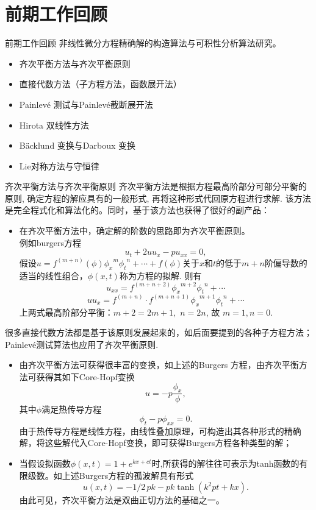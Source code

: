 \documentclass{beamer}
\begin{document}
\section{前期工作回顾}
\begin{frame}{前期工作回顾}
  非线性微分方程精确解的构造算法与可积性分析算法研究。
  \begin{itemize}
    \item 齐次平衡方法与齐次平衡原则\\[1mm]
    \item 直接代数方法（子方程方法，函数展开法）\\[1mm]
    \item Painlev\'e 测试与Painlev\'e截断展开法 \\[1mm]
    \item Hirota 双线性方法 \\[1mm]
    \item B\"acklund 变换与Darboux 变换\\[1mm]
    \item Lie对称方法与守恒律 
  \end{itemize}
\end{frame}
\begin{frame}{齐次平衡方法与齐次平衡原则}
  齐次平衡方法是根据方程最高阶部分可部分平衡的原则, 确定方程的解应具有的一般形式, 再将这种形式代回原方程进行求解. 该方法是完全程式化和算法化的。同时，基于该方法也获得了很好的副产品：
  \begin{itemize}
    \item 在齐次平衡方法中，确定解的阶数的思路即为齐次平衡原则。\\
    例如burgers方程
  \[
    u_t+2uu_x-pu_{xx}=0,
  \]
 假设$u=f^{(m+n)}(\phi){\phi_x}^m{\phi_t}^n+\cdots+f(\phi)$关于$x$和$t$的低于$m+n$阶偏导数的适当的线性组合，$\phi(x,t)$称为方程的拟解. 则有
 \[
   u_{xx}= f^{(m+n+2)}{\phi_x}^{m+2}{\phi_t}^n+\cdots     
\]
  \[
uu_x=f^{(m+n)}\cdot f^{(m+n+1)}{\phi_x}^{m+1}{\phi_t}^n +\cdots  
\]
上两式最高阶部分平衡：$m+2=2m+1,\,\, n=2n$, 故 $m=1,n=0$.
\end{itemize}
很多直接代数方法都是基于该原则发展起来的，如后面要提到的各种子方程方法；Painlev\'{e}测试算法也应用了齐次平衡原则.
\end{frame}
\begin{frame}    
  \begin{itemize}  
    \item 由齐次平衡方法可获得很丰富的变换，如上述的Burgers 方程，由齐次平衡方法可获得其如下Core-Hopf变换
      \[
        u=-p\dfrac{\phi_x}{\phi},
      \]
      其中$\phi$满足热传导方程
      \[
        \phi_t-p\phi_{xx}=0.
      \]
     由于热传导方程是线性方程，由线性叠加原理，可构造出其各种形式的精确解，将这些解代入Core-Hopf变换，即可获得Burgers方程各种类型的解；
    \item 当假设拟函数$\phi(x,t)=1+e^{kx+ct}$时,所获得的解往往可表示为tanh函数的有限级数。如上述Burgers方程的孤波解具有形式
   \[
     u \left( x,t \right) =-1/2\,pk-pk\tanh \left( {k}^{2}pt+kx \right).\]
  由此可见，齐次平衡方法是双曲正切方法的基础之一。 
   \end{itemize}
\end{frame}
\end{document}
